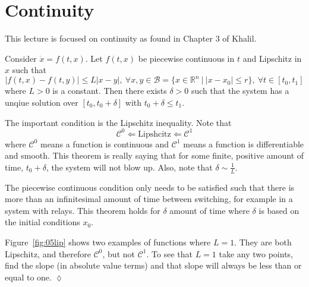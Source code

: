\mainmatter%
\setcounter{page}{1}

\lectureseries[\course]{\course}

\date{January 19, 2010}

\setaddress%

\setcounter{lecture}{4}
\setcounter{chapter}{4}


\section{Continuity}
This lecture is focused on continuity as found in Chapter 3 of Khalil.

\begin{theorem}
\label{th:05lip}
Consider $\dot{x} = f(t,x)$.
Let $f(t,x)$ be piecewise continuous in $t$ and Lipschitz in $x$ such that
$$|f(t,x) - f(t,y)| \leq L|x-y|,~\forall x,y\in\mathcal{B} = \{x\in\mathbb{R}^n~|~|x-x_0|\leq r\},~\forall t\in[t_0,t_1]$$
where $L>0$ is a constant.
Then there exists $\delta>0$ such that the system has a unqiue solution over $[t_0,t_0+\delta]$ with $t_0+\delta\leq t_1$.
\end{theorem}

The important condition is the Lipschitz inequality.
Note that
$$\mathcal{C}^0 \Leftarrow \text{Lipshcitz} \Leftarrow \mathcal{C}^1$$
where $\mathcal{C}^0$ means a function is continuous and $\mathcal{C}^1$ means a function is differentiable and smooth.
This theorem is really saying that for some finite, positive amount of time, $t_0+\delta$, the system will not blow up.
Also, note that $\delta\sim\frac{1}{L}$.

The piecewise continuous condition only needs to be satisfied such that there is more than an infinitesimal amount of time between switching, for example in a system with relays.
This theorem holds for $\delta$ amount of time where $\delta$ is based on the initial conditions $x_0$.

\begin{example}
Figure~\ref{fig:05lip} shows two examples of functions where $L=1$.
They are both Lipschitz, and therefore $\mathcal{C}^0$, but not $\mathcal{C}^1$.
To see that $L=1$ take any two points, find the slope (in absolute value terms) and that slope will always be less than or equal to one.
$\lozenge$
\end{example}

